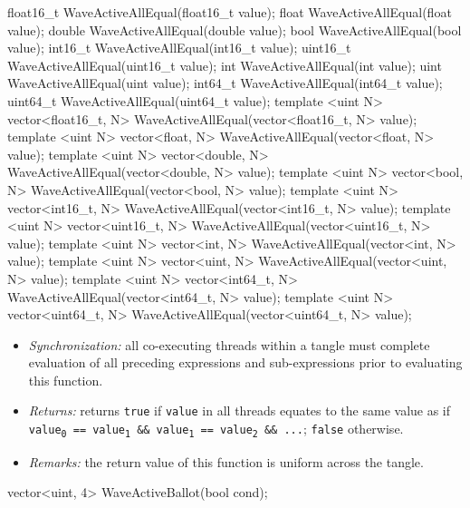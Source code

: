 \begin{HLSL}
float16_t WaveActiveAllEqual(float16_t value);
float WaveActiveAllEqual(float value);
double WaveActiveAllEqual(double value);
bool WaveActiveAllEqual(bool value);
int16_t WaveActiveAllEqual(int16_t value);
uint16_t WaveActiveAllEqual(uint16_t value);
int WaveActiveAllEqual(int value);
uint WaveActiveAllEqual(uint value);
int64_t WaveActiveAllEqual(int64_t value);
uint64_t WaveActiveAllEqual(uint64_t value);
template <uint N> vector<float16_t, N> WaveActiveAllEqual(vector<float16_t, N> value);
template <uint N> vector<float, N> WaveActiveAllEqual(vector<float, N> value);
template <uint N> vector<double, N> WaveActiveAllEqual(vector<double, N> value);
template <uint N> vector<bool, N> WaveActiveAllEqual(vector<bool, N> value);
template <uint N> vector<int16_t, N> WaveActiveAllEqual(vector<int16_t, N> value);
template <uint N> vector<uint16_t, N> WaveActiveAllEqual(vector<uint16_t, N> value);
template <uint N> vector<int, N> WaveActiveAllEqual(vector<int, N> value);
template <uint N> vector<uint, N> WaveActiveAllEqual(vector<uint, N> value);
template <uint N> vector<int64_t, N> WaveActiveAllEqual(vector<int64_t, N> value);
template <uint N> vector<uint64_t, N> WaveActiveAllEqual(vector<uint64_t, N> value);
\end{HLSL}

\begin{itemize}
  \item \textit{Synchronization:} all co-executing threads within a \gls{tangle}
  must complete evaluation of all preceding expressions and sub-expressions
  prior to evaluating this function.
  \item \textit{Returns:} returns \texttt{true} if \texttt{value} in all threads
  equates to the same value as if \texttt{value\textsubscript{0} ==
  value\textsubscript{1} \&\& value\textsubscript{1} == value\textsubscript{2}
  \&\& ...}; \texttt{false} otherwise.
  \item \textit{Remarks:} the return value of this function is uniform across
  the \gls{tangle}.
\end{itemize}

\begin{HLSL}
vector<uint, 4> WaveActiveBallot(bool cond);
\end{HLSL}

